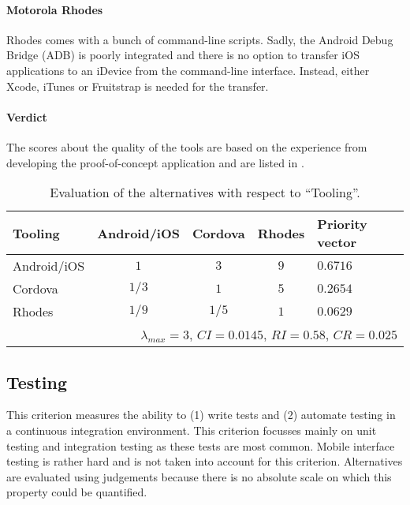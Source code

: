 \paragraph{Motorola Rhodes} Rhodes comes with a bunch of command-line scripts. Sadly, the Android Debug Bridge (ADB) is poorly integrated  and there is no option to transfer iOS applications to an iDevice from the command-line interface. Instead, either Xcode, iTunes or Fruitstrap is needed for the transfer. 


\paragraph{Verdict} The scores about the quality of the tools are based on the experience from developing the proof-of-concept application and are listed in . 

\begin{table}[h!]
    \begin{center}
        \begin{tabular}{lcccl}
            \hline
            \textbf{Tooling} & Android/iOS & Cordova & Rhodes & Priority vector \\
            \hline
            Android/iOS      & $1$         & $3$     & $9$    & $0.6716$        \\
            Cordova          & $1/3$       & $1$     & $5$    & $0.2654$        \\
            Rhodes           & $1/9$       & $1/5$   & $1$    & $0.0629$        \\
            \hline
            \multicolumn{5}{r}{$\lambda_{max} = 3$, $CI = 0.0145$, $RI = 0.58$, $CR = 0.025$}\\
            \hline
        \end{tabular}
        \caption{Evaluation of the alternatives with respect to ``Tooling''.}
        \label{tab:tooling}
    \end{center}
\end{table}

\subsection{Testing}

This criterion measures the ability to (1) write tests and (2) automate testing in a continuous integration environment. This criterion focusses mainly on unit testing and integration testing as these tests are most common. Mobile interface testing is rather hard and is not taken into account for this criterion. Alternatives are evaluated using judgements because there is no absolute scale on which this property could be quantified. 

